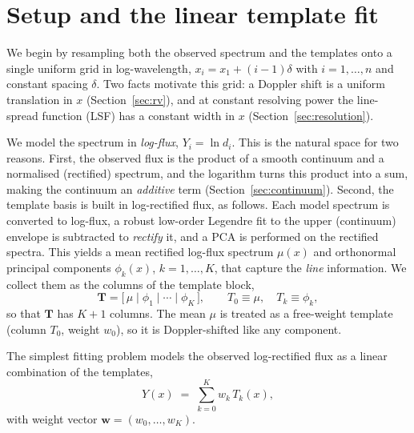 \documentclass[11pt]{article}
\begin{document}
\section{Setup and the linear template fit}
\label{sec:setup}
We begin by resampling both the observed spectrum and the templates onto a single
uniform grid in log-wavelength, $x_i = x_1 + (i-1)\delta$ with $i=1,\dots,n$ and
constant spacing $\delta$. Two facts motivate this grid: a Doppler shift is a
uniform translation in $x$ (Section~\ref{sec:rv}), and at constant resolving
power the line-spread function (LSF) has a constant width in $x$
(Section~\ref{sec:resolution}).

We model the spectrum in \emph{log-flux}, $Y_i=\ln d_i$. This is the natural space
for two reasons. First, the observed flux is the product of a smooth continuum and
a normalised (rectified) spectrum, and the logarithm turns this product into a
sum, making the continuum an \emph{additive} term (Section~\ref{sec:continuum}).
Second, the template basis is built in log-rectified flux, as follows. Each model
spectrum is converted to log-flux, a robust low-order Legendre fit to the upper
(continuum) envelope is subtracted to \emph{rectify} it, and a PCA is performed on
the rectified spectra. This yields a mean rectified log-flux spectrum $\mu(x)$ and
orthonormal principal components $\phi_k(x)$, $k=1,\dots,K$, that capture the
\emph{line} information. We collect them as the columns of the template block,
\begin{equation}
  \mathbf{T} = \big[\,\mu \;\big|\; \phi_1 \;\big|\; \cdots \;\big|\; \phi_K\,\big],
  \qquad T_0\equiv\mu,\quad T_k\equiv\phi_k,
\end{equation}
so that $\mathbf{T}$ has $K+1$ columns. The mean $\mu$ is treated as a
free-weight template (column $T_0$, weight $w_0$), so it is Doppler-shifted like
any component.

The simplest fitting problem models the observed log-rectified flux as a linear
combination of the templates,
\begin{equation}
  Y(x) \;=\; \sum_{k=0}^{K} w_k\, T_k(x),
  \label{eq:linmodel}
\end{equation}
with weight vector $\mathbf{w}=(w_0,\dots,w_K)$.
\end{document}
